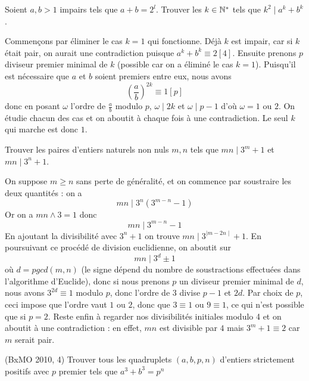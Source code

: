 \begin{exo}
Soient $a,b>1$ impairs tels que $a+b=2^l$. Trouver les $k \in\mathbb N^*$ tels que $k^2\mid a^k+b^k$.
\end{exo}


\begin{sol}
Commençons par éliminer le cas $k=1$ qui fonctionne.
Déjà $k$ est impair, car si $k$ était pair, on aurait une contradiction puisque $a^k+b^k\equiv 2[4]$. Ensuite prenons $p$ diviseur premier minimal de $k$ (possible car on a éliminé le cas $k=1$). Puisqu'il est nécessaire que $a$ et $b$ soient premiers entre eux, nous avons
$$\left(\frac ab\right)^{2k}\equiv 1[p]$$
donc en posant $\omega$ l'ordre de $\frac ab$ modulo $p$, $\omega\mid 2k$ et $\omega\mid p-1$ d'où $\omega=1$ ou $2$. On étudie chacun des cas et on aboutit à chaque fois à une contradiction.\newline
Le seul $k$ qui marche est donc $1$.
\end{sol}


\begin{exo}
Trouver les paires d'entiers naturels non nuls $m,n$ tels que $mn\mid 3^m+1$ et $mn\mid 3^n+1$.
\end{exo}


\begin{sol}
On suppose $m\geq n$ sans perte de généralité, et on commence par soustraire les deux quantités : on a $$mn\mid 3^{n}(3^{m-n}-1)$$
Or on a $mn\wedge 3=1$ donc
$$mn\mid 3^{m-n}-1$$
En ajoutant la divisibilité avec $3^n+1$ on trouve
$mn\mid 3^{\mid m-2n\mid}+1$.\newline
En poursuivant ce procédé de division euclidienne, on aboutit sur $$mn\mid 3^d\pm1$$ où $d=pgcd(m,n)$ (le signe dépend du nombre de soustractions effectuées dans l'algorithme d'Euclide), donc si nous prenons $p$ un diviseur premier minimal de $d$, nous avons $3^{2d}\equiv 1$ modulo $p$, donc l'ordre de $3$ divise $p-1$ et $2d$. Par choix de $p$, ceci impose que l'ordre vaut $1$ ou $2$, donc que $3\equiv 1$ ou $9\equiv 1$, ce qui n'est possible que si $p=2$. Reste enfin à regarder nos divisibilités initiales modulo 4 et on aboutit à une contradiction : en effet, $mn$ est divisible par $4$ mais $3^m+1\equiv 2$ car $m$ serait pair.
\end{sol}


\begin{exo}
(BxMO 2010, 4) Trouver tous les quadruplets $(a,b,p,n)$ d'entiers strictement positifs avec $p$ premier tels que $a^3+b^3=p^n$
\end{exo}


